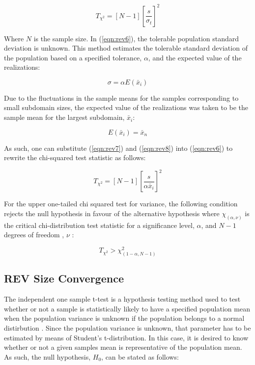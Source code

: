 \begin{equation}
T_{\chi^2}=\left[N-1\right]\left[\frac{s}{\sigma_t}\right]^2
\label{eqn:rev6}
\end{equation}

Where $N$ is the sample size. In (\ref{eqn:rev6}), the tolerable population standard deviation is unknown. This method estimates the tolerable standard deviation of the population based on a specified tolerance, $\alpha$, and the expected value of the realizations:

\begin{equation}
\sigma=\alpha E\left(\bar{x}_i\right)
\label{eqn:rev7}
\end{equation}

Due to the fluctuations in the sample means for the samples corresponding to small subdomain sizes, the expected value of the realizations was taken to be the sample mean for the largest subdomain, $\bar{x}_i$:

\begin{equation}
E\left(\bar{x}_i\right) = \bar{x}_n
\label{eqn:rev8}
\end{equation}

As such, one can substitute (\ref{eqn:rev7}) and (\ref{eqn:rev8}) into (\ref{eqn:rev6}) to rewrite the chi-squared test statistic as follows:

\begin{equation}
T_{\chi^2}=\left[N-1\right]\left[\frac{s}{\alpha \bar{x}_i}\right]^2
\label{eqn:rev9}
\end{equation}

For the upper one-tailed chi squared test for variance, the following condition rejects the null hypothesis in favour of the alternative hypothesis where $\chi_{\left(\alpha, \nu\right)}$ is the critical chi-distribution test statistic for a significance level, $\alpha$, and $N-1$ degrees of freedom , $\nu$ \citep{walpole_probability_2007}:

\begin{equation}
T_{\chi^2}>\chi^2_{\left(1-\alpha, N-1\right)}
\label{eqn:rev10}
\end{equation}

\subsection{REV Size Convergence}
The independent one sample t-test is a hypothesis testing method used to test whether or not a sample is statistically likely to have a specified population mean when the population variance is unknown if the population belongs to a normal distirbution \citep{walpole_probability_2007}. Since the population variance is unknown, that parameter has to be estimated by means of Student’s t-distribution. In this case, it is desired to know whether or not a given samples mean is representative of the population mean. As such, the null hypothesis, $H_0$, can be stated as follows:


